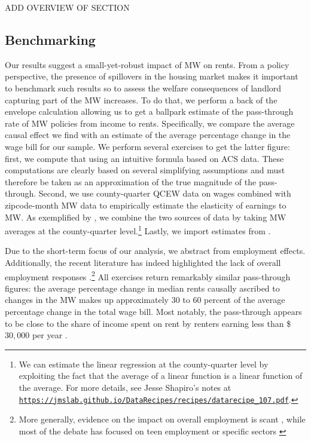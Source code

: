
ADD OVERVIEW OF SECTION

\subsection{Benchmarking}

Our results suggest a small-yet-robust impact of MW on rents. From a policy perspective, 
the presence of spillovers in the housing market makes it important to benchmark such results 
so to assess the welfare consequences of landlord capturing part of the MW increases. 
To do that, we perform a back of the envelope calculation allowing us to get a ballpark estimate 
of the pass-through rate of MW policies from income to rents. Specifically, we compare the average 
causal effect we find with an estimate of the average percentage change in the wage 
bill for our sample. We perform several exercises to get the latter figure: first, we 
compute that using an intuitive formula based on ACS data. These computations are 
clearly based on several simplifying assumptions and must therefore be taken as an approximation 
of the true magnitude of the pass-through. Second, we use county-quarter QCEW data on wages 
combined with zipcode-month MW data to empirically estimate the elasticity of earnings to MW. 
As exemplified by \textcite{gentzkow2015newspapers}, we combine the two sources of data by 
taking MW averages at the county-quarter level.\footnote{We can estimate the linear 
	regression at the county-quarter level by exploiting the fact that the average of a linear 
	function is a linear function of the average. For more details, see Jesse Shapiro's notes at \href{https://jmslab.github.io/DataRecipes/recipes/datarecipe_107.pdf}{\texttt{https://jmslab.github.io/DataRecipes/recipes/datarecipe\_107.pdf}}.} 
Lastly, we import estimates from \textcite{CegnizEtAl2019}. 

Due to the short-term focus of our analysis, we abstract from employment effects. Additionally, 
the recent literature has indeed highlighted the lack of overall employment responses 
\parencite{CegnizEtAl2019}.\footnote{More generally, evidence on the impact on overall 
	employment is scant \parencite{dube2019impacts}, while most of the debate has focused on 
	teen employment \parencite{card1992using, allegretto2017credible} or specific sectors 
	\parencite{katz1992effect, card2000minimum, dube2010minimum}} All exercises return 
remarkably similar pass-through figures: the average percentage change in median rents causally 
ascribed to changes in the MW makes up approximately $30$ to $60$ percent of the average 
percentage change in the total wage bill. Most notably, the pass-through appears to be close 
to the share of income spent on rent by renters earning less than \$$30,000$ per 
year \parencite{fernald2020americas}.

